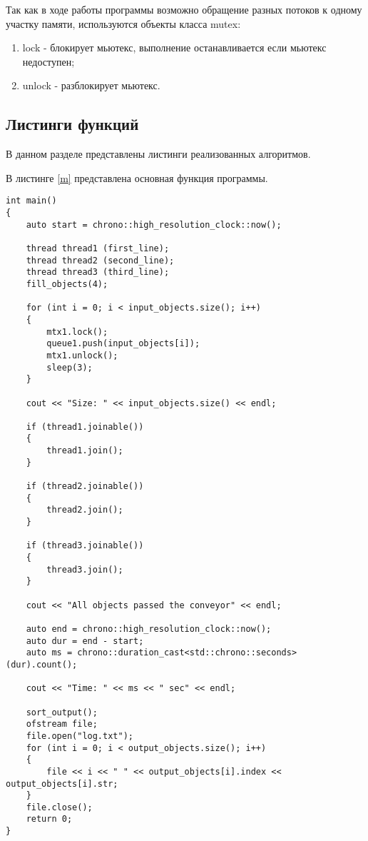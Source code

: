 \documentclass[a4paper, 14pt]{article}
\begin{document}
		Так как в ходе работы программы возможно обращение разных потоков к одному участку памяти, используются объекты класса mutex:
		
\begin{enumerate}
	\item lock - блокирует мьютекс, выполнение останавливается если мьютекс недоступен;
	\item unlock - разблокирует мьютекс.
\end{enumerate}
	
\newpage
\subsection{Листинги функций}

В данном разделе представлены листинги реализованных алгоритмов.

В листинге \ref{m} представлена основная функция программы.\\

\begin{lstlisting}[label=m,caption=Функция main()]
int main()
{
    auto start = chrono::high_resolution_clock::now();
    
    thread thread1 (first_line);
    thread thread2 (second_line);
    thread thread3 (third_line);
    fill_objects(4);
    
    for (int i = 0; i < input_objects.size(); i++)
    {
        mtx1.lock();
        queue1.push(input_objects[i]);
        mtx1.unlock();
        sleep(3);
    }
    
    cout << "Size: " << input_objects.size() << endl;
    
    if (thread1.joinable())
    {
        thread1.join();
    }
    
    if (thread2.joinable())
    {
        thread2.join();
    }
    
    if (thread3.joinable())
    {
        thread3.join();
    }
    
    cout << "All objects passed the conveyor" << endl;
    
    auto end = chrono::high_resolution_clock::now();
    auto dur = end - start;
    auto ms = chrono::duration_cast<std::chrono::seconds>(dur).count();
    
    cout << "Time: " << ms << " sec" << endl;
    
    sort_output();
    ofstream file;
    file.open("log.txt");
    for (int i = 0; i < output_objects.size(); i++)
    {
        file << i << " " << output_objects[i].index << output_objects[i].str;
    }
    file.close();
    return 0;
}
\end{lstlisting}
\end{document}
